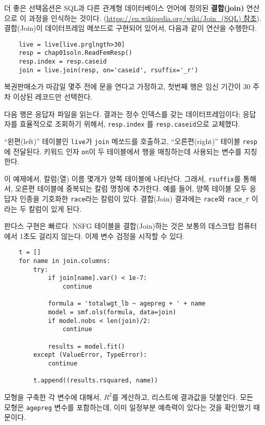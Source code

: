 더 좋은 선택옵션은 SQL과 다른 관계형 데이터베이스 언어에 정의된 {\bf 결합(join)} 연산으로 이 과정을 인식하는 것이다. (\url{https://en.wikipedia.org/wiki/Join_(SQL) 참조}).
결합(Join)이 데이터프레임 메쏘드로 구현되어 있어서, 다음과 같이 연산을 수행한다.

\begin{verbatim}
    live = live[live.prglngth>30]
    resp = chap01soln.ReadFemResp()
    resp.index = resp.caseid
    join = live.join(resp, on='caseid', rsuffix='_r')
\end{verbatim}

복권판매소가 마감일 몇주 전에 문을 연다고 가정하고, 첫번째 행은 임신 기간이 30 주차 이상된 레코드만 선택한다. 

다음 행은 응답자 파일을 읽는다. 결과는 정수 인덱스를 갖는 데이터프레임이다; 응답자를 효율적으로 조회하기 위해서, {\tt resp.index} 를 {\tt resp.caseid}으로 교체했다.

``왼편(left)'' 테이블인 {\tt live}가 {\tt join} 메쏘드를 호출하고, ``오른편(right)'' 테이블 {\tt resp}에 전달된다. 키워드 인자 {\tt on}이 두 테이블에서 행을 매칭하는데 사용되는 변수를 지칭한다.

이 예제에서, 칼럼(열) 이름 몇개가 양쪽 테이블에 나타난다. 그래서, {\tt rsuffix}를 통해서, 오른편 테이블에 중복되는 칼럼 명칭에 추가한다.
예를 들어, 양쪽 테이블 모두 응답자 인종을 기호화한 {\tt race}라는 칼럼이 있다. 결합(Join) 결과에는 {\tt race}와 \verb"race_r" 이라는 두 칼럼이 있게 된다.

판다스 구현은 빠르다. NSFG 테이블을 결합(Join)하는 것은 보통의 데스크탑 컴퓨터에서 1초도 걸리지 않는다. 이제 변수 검정을 시작할 수 있다.

\begin{verbatim}
    t = []
    for name in join.columns:
        try:
            if join[name].var() < 1e-7:
                continue

            formula = 'totalwgt_lb ~ agepreg + ' + name
            model = smf.ols(formula, data=join)
            if model.nobs < len(join)/2:
                continue

            results = model.fit()
        except (ValueError, TypeError):
            continue

        t.append((results.rsquared, name))
\end{verbatim}

모형을 구축한 각 변수에 대해서, $R^2$를 계산하고, 리스트에 결과값을 덧붙인다. 모든 모형은 {\tt agepreg} 변수를 포함하는데, 이미 일정부분 예측력이 있다는 것을 확인했기 때문이다.

